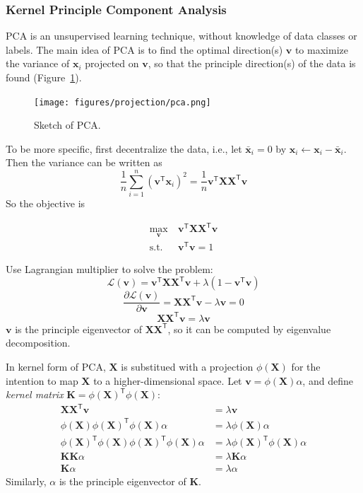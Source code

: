 \documentclass[journal]{IEEEtran}
\begin{document}
\subsubsection{Kernel Principle Component Analysis}
PCA is an unsupervised learning technique, without knowledge of data classes or labels. The main idea of PCA is to find the optimal direction(s) $\mathbf v$ to maximize the variance of $\mathbf x_i$ projected on $\mathbf v$, so that the principle direction(s) of the data is found (Figure~\ref{fig:pca}). 
\begin{figure}[htpb]
  \centering
  \texttt{[image: figures/projection/pca.png]}
  \caption{Sketch of PCA.}
  \label{fig:pca}
\end{figure}

To be more specific, first decentralize the data, i.e., let $\bar {\mathbf x}_i = 0$ by $\mathbf x_i\leftarrow\mathbf x_i-\bar{\mathbf x}_i$. Then the variance can be written as
$$
\frac{1}{n}\sum_{i=1}^n (\mathbf v^\mathsf{T} \mathbf x_i)^2 = \frac{1}{n}\mathbf v^\mathsf{T} \mathbf X \mathbf X^\mathsf{T} \mathbf v
$$
So the objective is

\begin{align*}
\max_{\mathbf v} &\ \mathbf v^\mathsf{T} \mathbf X \mathbf X^\mathsf{T} \mathbf v \\
\mathrm{s.t.} &\ \mathbf v^\mathsf{T} \mathbf v = 1
\end{align*}

Use Lagrangian multiplier to solve the problem:
$$\mathcal L(\mathbf v) = \mathbf v^\mathsf{T} \mathbf X \mathbf X^\mathsf{T} \mathbf v + \lambda(1 - \mathbf v^\mathsf{T} \mathbf v)$$
$$\frac{\partial \mathcal L(\mathbf v)}{\partial \mathbf v} = \mathbf X\mathbf X^\mathsf{T} \mathbf v - \lambda \mathbf v = 0$$
$$\mathbf X\mathbf X^\mathsf{T} \mathbf v = \lambda \mathbf v
$$
$\mathbf v$ is the principle eigenvector of $\mathbf X\mathbf X^\mathsf{T}$, so it can be computed by eigenvalue decomposition.

In kernel form of PCA, $\mathbf X$ is substitued with a projection $\phi(\mathbf X)$ for the intention to map $\mathbf X$ to a higher-dimensional space. Let $\mathbf v = \phi(\mathbf X)\alpha$, and define \emph{kernel matrix} $\mathbf K = \phi(\mathbf X)^\mathsf{T} \phi(\mathbf X)$:
\begin{align*}
\mathbf X\mathbf X^\mathsf{T} \mathbf v &= \lambda \mathbf v \\
\phi(\mathbf X)\phi(\mathbf X)^\mathsf{T} \phi(\mathbf X) \alpha &= \lambda \phi(\mathbf X) \alpha \\
\phi(\mathbf X)^\mathsf{T}\phi(\mathbf X)\phi(\mathbf X)^\mathsf{T} \phi(\mathbf X) \alpha &= \lambda \phi(\mathbf X)^\mathsf{T}\phi(\mathbf X) \alpha \\
\mathbf K \mathbf K \alpha &= \lambda \mathbf K\alpha \\
\mathbf K \alpha &= \lambda \alpha
\end{align*}
Similarly, $\alpha$ is the principle eigenvector of $\mathbf K$.
\end{document}
